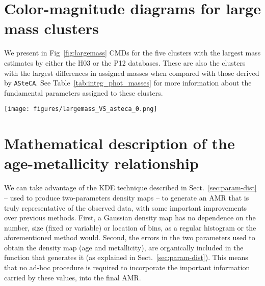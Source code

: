\documentclass[draft]{aa}
\begin{document}
\begin{appendix}
\section{Color-magnitude diagrams for large mass clusters}
\label{apdx:largemass}

We present in Fig~\ref{fig:largemass} CMDs for the five clusters with the largest
mass estimates by either the H03 or the P12 databases. These are also the clusters
with the largest differences in assigned masses when compared with those derived
by \texttt{ASteCA}.
See Table~\ref{tab:integ_phot_masses} for more information about the fundamental
parameters assigned to these clusters.

\begin{figure*}
\texttt{[image: figures/largemass\_VS\_asteca\_0.png]}
\caption{CMDs for the clusters with the largest masses assigned by H03 and/or P12.
The best match synthetic cluster is plotted to the right, and the observed
cluster region CMD to the left, for each cluster.}
\label{fig:largemass}
\end{figure*}





\section{Mathematical description of the age-metallicity relationship}
\label{apdx:amr_description}

We can take advantage of the KDE technique described in
Sect.~\ref{sec:param-dist} -- used to produce two-parameters density maps -- to
generate an AMR that is truly representative of the observed data, with some
important improvements over previous methods.
%
First, a Gaussian density map has no dependence on the number, size 
(fixed or variable) or location of bins, as a regular histogram or the
aforementioned method would.
Second, the errors in the two parameters used to obtain the density map (age and
metallicity), are organically included in the function that generates it
(as explained in Sect.~\ref{sec:param-dist}).
This means that no ad-hoc procedure is required to incorporate the important
information carried by these values, into the final AMR.\@


\end{appendix}
\end{document}
